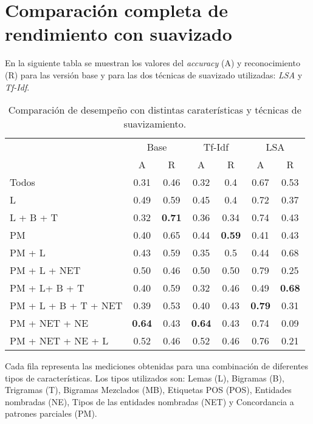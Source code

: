 \chapter*{Comparación completa de rendimiento con suavizado}

En la siguiente tabla se muestran los valores del \textit{accuracy} (A) y reconocimiento (R) para las versión base y para las dos técnicas de suavizado utilizadas: \textit{LSA} y \textit{Tf-Idf}.


\begin{table}[h]
\begin{center}
\begin{tabular}{l c c | c c | c c}
& \multicolumn{2}{c|}{Base} & \multicolumn{2}{c|}{Tf-Idf} & \multicolumn{2}{c}{LSA}\\ [0.5ex]
& A & R & A & R & A & R \\ [0.5ex]
\hline
Todos & 0.31 & 0.46 & 0.32 & 0.4 & 0.67 & 0.53 \\[0.5ex]
L & 0.49 & 0.59 & 0.45 & 0.4 & 0.72 & 0.37 \\[0.5ex]
L + B + T & 0.32 & \textbf{0.71} & 0.36 & 0.34 & 0.74 & 0.43 \\[0.5ex]
PM & 0.40 & 0.65 & 0.44 & \textbf{0.59} & 0.41 & 0.43 \\[0.5ex]
PM + L & 0.43 & 0.59 & 0.35 & 0.5 & 0.44 & 0.68 \\[0.5ex]
PM + L + NET & 0.50 & 0.46 & 0.50 & 0.50 & 0.79 & 0.25\\[0.5ex]
PM + L+ B + T & 0.40 & 0.59 & 0.32 & 0.46 & 0.49 & \textbf{0.68} \\[0.5ex]
PM + L + B + T + NET & 0.39 & 0.53 & 0.40 & 0.43 & \textbf{0.79} & 0.31 \\[0.5ex]
PM + NET + NE & \textbf{0.64} & 0.43 & \textbf{0.64} & 0.43 & 0.74 & 0.09 \\[0.5ex]
PM + NET + NE + L & 0.52 & 0.46 & 0.52 & 0.46 & 0.76 & 0.21 \\[0.5ex]
\hline
\end{tabular}
\end{center}
\caption{Comparación de desempeño con distintas caraterísticas y técnicas de suavizamiento.}\label{t-ap-4}
\end{table}

Cada fila representa las mediciones obtenidas para una combinación de diferentes tipos de características. Los tipos utilizados son: Lemas (L), Bigramas (B), Trigramas (T), Bigramas Mezclados (MB), Etiquetas POS (POS), Entidades nombradas (NE), Tipos de las entidades nombradas (NET) y Concordancia a patrones parciales (PM).